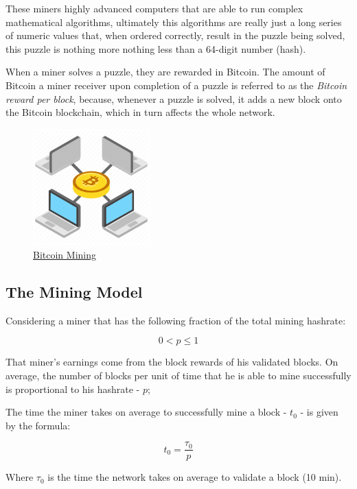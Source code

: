 \documentclass{article}
\begin{document}
These miners highly advanced computers that are able to run complex mathematical algorithms, ultimately this algorithms are really just a long series of numeric values that, when ordered correctly, result in the puzzle being solved, this puzzle is nothing more nothing less than a 64-digit number (hash).

When a miner solves a puzzle, they are rewarded in Bitcoin. The amount of Bitcoin a miner receiver upon completion of a puzzle is referred to as the \textit{Bitcoin reward per block}, because, whenever a puzzle is solved, it adds a new block onto the Bitcoin blockchain, which in turn affects the whole network.

\begin{figure}[H]
    \begin{center}
        \includegraphics[width=0.4\textwidth]{images/bitcoin_mining.png}
        \caption{\href{https://pngio.com/images/png-a1856995.html}{\underline{Bitcoin Mining}}}
    \end{center}
\end{figure}

\subsection{The Mining Model}

Considering a miner that has the following fraction of the total mining hashrate:

\[0 < p \leq 1\]

That miner's earnings come from the block rewards of his validated blocks. On average, the number of blocks per unit of time that he is able to mine successfully is proportional to his hashrate - \(p\);

The time the miner takes on average to successfully mine a block - \(t_0\) - is given by the formula:

\[t_0 = \frac{\tau_0}{p}\]

Where \(\tau_0\) is the time the network takes on average to validate a block (10 min).
\end{document}
